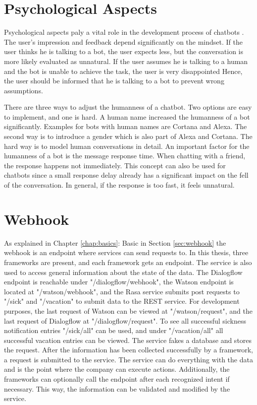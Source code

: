 \section{Psychological Aspects}
Psychological aspects paly a vital role in the development process of chatbots \citet{brandtzaeg2018chatbots}.
The user's impression and feedback depend significantly on the mindset.
If the user thinks he is talking to a bot, the user expects less, but the conversation is more likely evaluated as unnatural.
If the user assumes he is talking to a human and the bot is unable to achieve the task, the user is very disappointed
Hence, the user should be informed that he is talking to a bot to prevent wrong assumptions.

There are three ways to adjust the humanness of a chatbot.
Two options are easy to implement, and one is hard.
A human name increased the humanness of a bot significantly.
Examples for bots with human names are Cortana and Alexa.
The second way is to introduce a gender which is also part of Alexa and Cortana.
The hard way is to model human conversations in detail.
An important factor for the humanness of a bot is the message response time.
When chatting with a friend, the response happens not immediately.
This concept can also be used for chatbots since a small response delay already has a significant impact on the fell of the conversation.
In general, if the response is too fast, it feels unnatural.

\section{Webhook}
As explained in Chapter \ref{chap:basics}: Basic in Section \ref{sec:webhook} 
the webhook is an endpoint where services can send requests to.
In this thesis, three frameworks are present, and each framework gets an endpoint.
The service is also used to access general information about the state of the data.
The Dialogflow endpoint is reachable under "/dialogflow/webhook",
the Watson endpoint is located at "/watson/webhook", and the Rasa service submits post requests to "/sick" and "/vacation" to submit data to the REST service.
For development purposes, the last request of Watson can be viewed at "/watson/request", and the last request of Dialogflow at "/dialogflow/request".
To see all successful sickness notification entries "/sick/all" can be used, and under "/vacation/all" all successful vacation entries can be viewed.
The service fakes a database and stores the request.
After the information has been collected successfully by a framework, a request is submitted to the service.
The service can do everything with the data and is the point where the company can execute actions.
Additionally, the frameworks can optionally call the endpoint after each recognized intent if necessary.
This way, the information can be validated and modified by the service.


